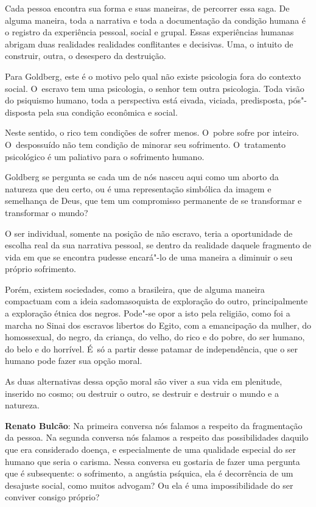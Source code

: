Cada pessoa encontra sua forma e suas maneiras, de percorrer essa saga.
De alguma maneira, toda a narrativa e toda a documentação da condição
humana é o registro da experiência pessoal, social e grupal. Essas
experiências humanas abrigam duas realidades realidades conflitantes e
decisivas. Uma, o intuito de construir, outra, o desespero da
destruição.

Para Goldberg, este é o motivo pelo qual não existe psicologia fora do
contexto social. O~escravo tem uma psicologia, o senhor tem outra
psicologia. Toda visão do psiquismo humano, toda a perspectiva está
eivada, viciada, predisposta, pós"-disposta pela sua condição econômica e
social.

Neste sentido, o rico tem condições de sofrer menos. O~pobre sofre por
inteiro. O~despossuído não tem condição de minorar seu sofrimento. O~tratamento psicológico é um paliativo para o sofrimento humano.

Goldberg se pergunta se cada um de nós nasceu aqui como um aborto da
natureza que deu certo, ou é uma representação simbólica da imagem e
semelhança de Deus, que tem um compromisso permanente de se transformar
e transformar o mundo?

O ser individual, somente na posição de não escravo, teria a
oportunidade de escolha real da sua narrativa pessoal, se dentro da
realidade daquele fragmento de vida em que se encontra pudesse
encará"-lo de uma maneira a diminuir o seu próprio sofrimento.

Porém, existem sociedades, como a brasileira, que de alguma maneira
compactuam com a ideia sadomasoquista de exploração do outro,
principalmente a exploração étnica dos negros. Pode"-se opor a isto pela
religião, como foi a marcha no Sinai dos escravos libertos do Egito, com
a emancipação da mulher, do homossexual, do negro, da criança, do velho,
do rico e do pobre, do ser humano, do belo e do horrível. É~só a partir
desse patamar de independência, que o ser humano pode fazer sua opção
moral.

As duas alternativas dessa opção moral são viver a sua vida em
plenitude, inserido no cosmo; ou destruir o outro, se destruir e
destruir o mundo e a natureza.

\begin{center}\asterisc{}\end{center}

\abrefala
 

\textbf{Renato Bulcão}: Na primeira conversa nós falamos a respeito da
fragmentação da pessoa. Na segunda conversa nós falamos a respeito das
possibilidades daquilo que era considerado doença, e especialmente de
uma qualidade especial do ser humano que seria o carisma. Nessa conversa
eu gostaria de fazer uma pergunta que é subsequente: o sofrimento, a
angústia psíquica, ela é decorrência de um desajuste social, como muitos
advogam? Ou ela é uma impossibilidade do ser
conviver consigo próprio?

